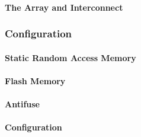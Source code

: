 \paragraph{The Array and Interconnect}
\label{fpga:deviceArchitecture:arrayAndInterconnect}

\subsubsection{Configuration}
\label{fpga:deviceArchitecture:conf}

\paragraph{Static Random Access Memory}
\label{fpga:deviceArchitecture:sram}

\paragraph{Flash Memory}
\label{fpga:deviceArchitecture:flash}

\paragraph{Antifuse}
\label{fpga:deviceArchitecture:antifuse}

\paragraph{Configuration}
\label{fpga:deviceArchitecture:conf}
